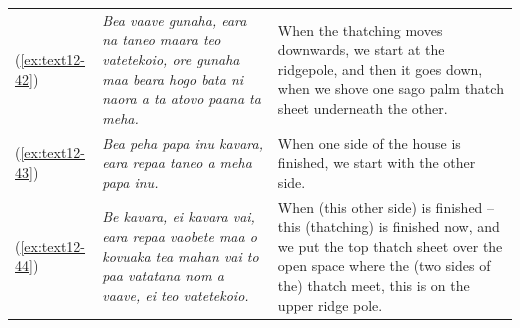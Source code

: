 \documentclass[output=paper]{langscibook}
\begin{document}
\begin{xltabular}{\textwidth}{lXX}
    (\ref{ex:text12-42})&\textit{Bea vaave gunaha, eara na taneo maara teo vatetekoio, ore gunaha maa beara hogo bata ni naora a ta atovo paana ta meha.}&When the thatching moves downwards, we start at the ridgepole, and then it goes down, when we shove one sago palm thatch sheet underneath the other.\\
    (\ref{ex:text12-43})&\textit{Bea peha papa inu kavara, eara repaa taneo a meha papa inu.}&When one side of the house is finished, we start with the other side.\\
    (\ref{ex:text12-44})&\textit{Be kavara, ei kavara vai, eara repaa vaobete maa o kovuaka tea mahan vai to paa vatatana nom a vaave, ei teo vatetekoio.}&When (this other side) is finished -- this (thatching) is finished now, and we put the top thatch sheet over the open space where the (two sides of the) thatch meet, this is on the upper ridge pole.\\
\end{xltabular}
\end{document}
